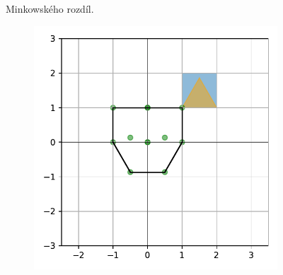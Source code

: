 \begin{figure}
\begin{subfigure}[t]{0.45\textwidth}
\end{subfigure}

\caption{Minkowského rozdíl.}
    \label{fig:minikowski}

    
\end{figure}


\begin{figure}


\begin{subfigure}[t]{0.29\textwidth}
    
    \centering
    \includegraphics[scale=0.5]{obrazky-figures/gjk/minkowksi_overlap.pdf}

\end{subfigure}
\hfill
\begin{subfigure}[t]{0.29\textwidth}
    

\end{subfigure}
\end{figure}
